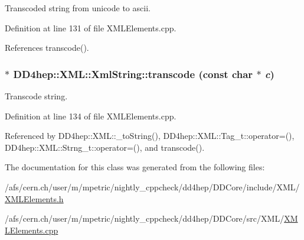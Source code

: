 Transcoded string from unicode to ascii. 

Definition at line 131 of file XMLElements.cpp.

References transcode().\hypertarget{class_d_d4hep_1_1_x_m_l_1_1_xml_string_af1afd620f73d33ad44ca67369e8d0b81}{
\subsubsection[{transcode}]{ $\ast$ DD4hep::XML::XmlString::transcode (const char $\ast$ {\em c})}}
\label{class_d_d4hep_1_1_x_m_l_1_1_xml_string_af1afd620f73d33ad44ca67369e8d0b81}


Transcode string. 

Definition at line 134 of file XMLElements.cpp.

Referenced by DD4hep::XML::\_\-toString(), DD4hep::XML::Tag\_\-t::operator=(), DD4hep::XML::Strng\_\-t::operator=(), and transcode().

The documentation for this class was generated from the following files:\begin{DoxyCompactItemize}
\item 
/afs/cern.ch/user/m/mpetric/nightly\_\-cppcheck/dd4hep/DDCore/include/XML/\hyperlink{_x_m_l_elements_8h}{XMLElements.h}\item 
/afs/cern.ch/user/m/mpetric/nightly\_\-cppcheck/dd4hep/DDCore/src/XML/\hyperlink{_x_m_l_elements_8cpp}{XMLElements.cpp}\end{DoxyCompactItemize}
